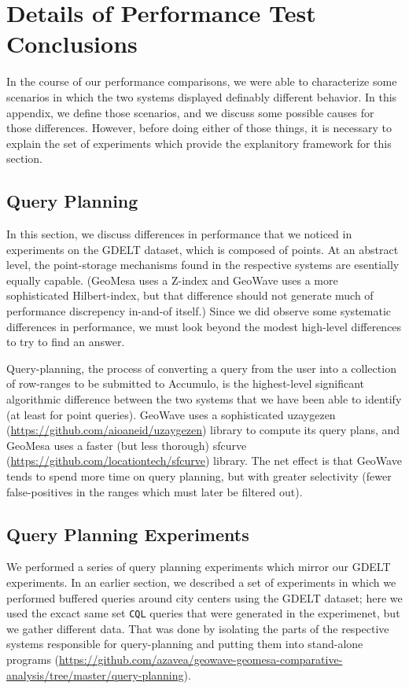 \section{Details of Performance Test Conclusions}
\label{appendix:planning}

In the course of our performance comparisons, we were able to characterize some scenarios in which the two systems displayed definably different behavior.
In this appendix, we define those scenarios, and we discuss some possible causes for those differences.
However, before doing either of those things, it is necessary to explain the set of experiments which provide the explanitory framework for this section.

\subsection{Query Planning}

In this section, we discuss differences in performance that we noticed in experiments on the GDELT dataset, which is composed of points.
At an abstract level, the point-storage mechanisms found in the respective systems are esentially equally capable.
(GeoMesa uses a Z-index and GeoWave uses a more sophisticated Hilbert-index, but that difference should not generate much of performance discrepency in-and-of itself.)
Since we did observe some systematic differences in performance, we must look beyond the modest high-level differences to try to find an answer.

Query-planning, the process of converting a query from the user into a collection of row-ranges to be submitted to Accumulo, is the highest-level significant algorithmic difference between the two systems that we have been able to identify (at least for point queries).
GeoWave uses a sophisticated uzaygezen (\url{https://github.com/aioaneid/uzaygezen}) library to compute its query plans,
and GeoMesa uses a faster (but less thorough) sfcurve (\url{https://github.com/locationtech/sfcurve}) library.
The net effect is that GeoWave tends to spend more time on query planning,
but with greater selectivity (fewer false-positives in the ranges which must later be filtered out).

\subsection{Query Planning Experiments}

We performed a series of query planning experiments which mirror our GDELT experiments.
In an earlier section, we described a set of experiments in which we performed buffered queries around city centers using the GDELT dataset; here we used the excact same set \texttt{CQL} queries that were generated in the experimenet, but we gather different data.
That was done by isolating the parts of the respective systems responsible for query-planning and putting them into stand-alone programs (\url{https://github.com/azavea/geowave-geomesa-comparative-analysis/tree/master/query-planning}).

